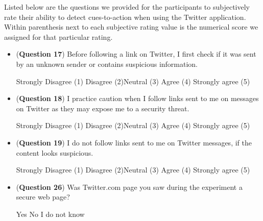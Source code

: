 Listed below are the questions we provided for the participants to  subjectively rate their ability to detect cues-to-action when using the Twitter application.
Within parenthesis next to each subjective rating value is the numerical score we assigned for that particular rating.
\begin{itemize}
\item (\textbf{Question 17}) Before following a link on Twitter, I first check if it was sent by an unknown sender or contains suspicious information.
\par Strongly Disagree (1) \hspace{0.5cm} Disagree (2)\hspace{0.5cm}Neutral (3)\hspace{0.5cm} Agree (4)\hspace{0.5cm} Strongly agree (5)
\item (\textbf{Question 18}) I practice caution when I follow links sent to me on messages on Twitter as they may expose me to a security threat.
\par Strongly Disagree (1) \hspace{0.5cm} Disagree (2)\hspace{0.5cm}Neutral (3)\hspace{0.5cm} Agree (4)\hspace{0.5cm} Strongly agree (5)
\item (\textbf{Question 19}) I do not follow links sent to me on Twitter messages, if the content looks suspicious.
\par Strongly Disagree (1) \hspace{0.5cm} Disagree (2)\hspace{0.5cm}Neutral (3)\hspace{0.5cm} Agree (4)\hspace{0.5cm} Strongly agree (5)
\item (\textbf{Question 26}) Was Twitter.com page you saw during the experiment a secure web page?
\par Yes \hspace{1cm} No \hspace{1cm} I do not know
\end{itemize}

